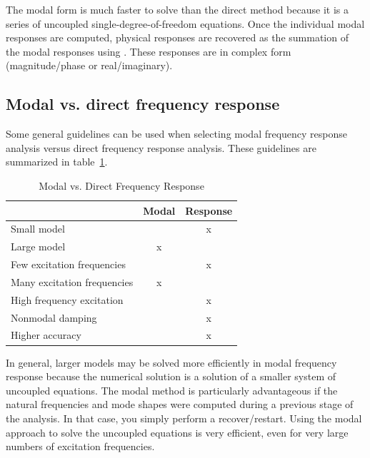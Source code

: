 The modal form is much faster to solve than the direct method
because it is a series of uncoupled single-degree-of-freedom equations.
Once the individual modal responses are computed, physical responses are
recovered as the summation of the modal responses using .
These responses are in complex form (magnitude/phase or real/imaginary).

\subsection{Modal vs. direct frequency response}
\label{subs:Modal vs. direct frequency response}

Some general guidelines can be used when selecting modal frequency
response analysis versus direct frequency response analysis.
These guidelines are summarized in table~\ref{tab:ModalDirectFreq}.

\begin{table}[b]
  \caption{Modal vs. Direct Frequency Response}
  \label{tab:ModalDirectFreq}
  \begin{center}
    \begin{tabular}{lcc}
      \hline
      & Modal & Response \\
      \hline
      Small model & & x \\
      Large model & x & \\
      Few excitation frequencies & & x \\
      Many excitation frequencies & x & \\
      High frequency excitation & & x \\
      Nonmodal damping & & x \\
      Higher accuracy & & x \\
      \hline
    \end{tabular}
  \end{center}
\end{table}

In general, larger models may be solved more efficiently in modal frequency
response because the numerical solution is a solution of a smaller system of
uncoupled equations.
The modal method is particularly advantageous if the natural frequencies and
mode shapes were computed during a previous stage of the analysis.
In that case, you simply perform a recover/restart.
Using the modal approach to solve the uncoupled equations is very efficient,
even for very large numbers of excitation frequencies.

